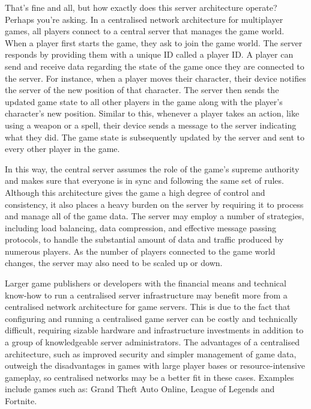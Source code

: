 That's fine and all, but how exactly does this server architecture operate? Perhaps you're asking. In a centralised network architecture for multiplayer games, all players connect to a central server that manages the game world. When a player first starts the game, they ask to join the game world. The server responds by providing them with a unique ID called a player ID.\cite{zhang2012design}
A player can send and receive data regarding the state of the game once they are connected to the server. For instance, when a player moves their character, their device notifies the server of the new position of that character. The server then sends the updated game state to all other players in the game along with the player's character's new position.
Similar to this, whenever a player takes an action, like using a weapon or a spell, their device sends a message to the server indicating what they did. The game state is subsequently updated by the server and sent to every other player in the game.

In this way, the central server assumes the role of the game's supreme authority and makes sure that everyone is in sync and following the same set of rules. Although this architecture gives the game a high degree of control and consistency, it also places a heavy burden on the server by requiring it to process and manage all of the game data.\cite{zhang2012design}
The server may employ a number of strategies, including load balancing, data compression, and effective message passing protocols, to handle the substantial amount of data and traffic produced by numerous players. As the number of players connected to the game world changes, the server may also need to be scaled up or down.\cite{claypool2006latency}

Larger game publishers or developers with the financial means and technical know-how to run a centralised server infrastructure may benefit more from a centralised network architecture for game servers. This is due to the fact that configuring and running a centralised game server can be costly and technically difficult, requiring sizable hardware and infrastructure investments in addition to a group of knowledgeable server administrators.\cite{birkettcentralized2021}
The advantages of a centralised architecture, such as improved security and simpler management of game data, outweigh the disadvantages in games with large player bases or resource-intensive gameplay, so centralised networks may be a better fit in these cases. Examples include games such as: Grand Theft Auto Online, League of Legends and Fortnite.\cite{zhang2012design}

